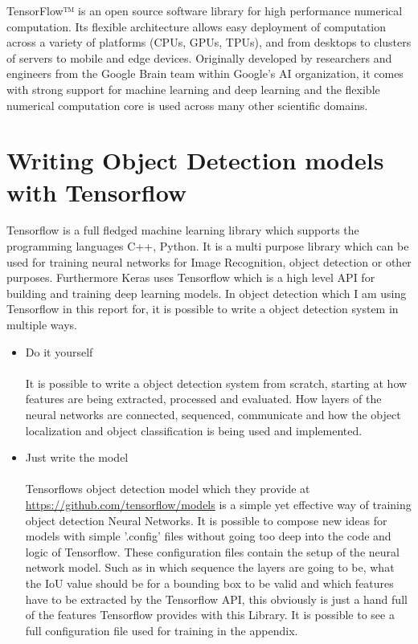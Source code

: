 
TensorFlow™ is an open source software library for high performance numerical computation. Its flexible architecture allows easy deployment
of computation across a variety of platforms (CPUs, GPUs, TPUs), and from desktops to clusters of servers to mobile and edge devices.
Originally developed by researchers and engineers from the Google Brain team within Google’s AI organization, it comes with strong support
for machine learning and deep learning and the flexible numerical computation core is used across many other scientific
domains.\cite{tensorflow}

\section{Writing Object Detection models with Tensorflow}\label{train-with-tensorflow}
Tensorflow is a full fledged machine learning library which supports the programming languages C++, Python. It is a multi purpose library
which can be used for training neural networks for Image Recognition, object detection or other purposes. Furthermore Keras uses Tensorflow
which is a high level API for building and training deep learning models. In object detection which I am using Tensorflow in this
report for, it is possible to write a object detection system in multiple ways.
\begin{itemize}
    \item Do it yourself \\ \\
        It is possible to write a object detection system from scratch, starting at how features are being extracted, processed and
        evaluated. How layers of the neural networks are connected, sequenced, communicate and how the object localization and object
        classification is being used and implemented.
    \item Just write the model \\ \\
        Tensorflows object detection model which they provide at \url{https://github.com/tensorflow/models} is a simple yet effective way of
        training object detection Neural Networks. It is possible to compose new ideas for models with simple '.config' files without going
        too deep into the code and logic of Tensorflow. These configuration files contain the setup of the neural network model. Such as in
        which sequence the layers are going to be, what the IoU value should be for a bounding box to be valid and which features have to
        be extracted by the Tensorflow API, this obviously is just a hand full of the features Tensorflow provides with this Library.
        It is possible to see a full configuration file used for training in the appendix.
\end{itemize}

